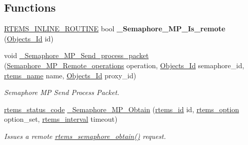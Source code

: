 \subsection*{Functions}
\begin{DoxyCompactItemize}
\item 
\mbox{\label{group__ClassicSEM_gadf24d8b39c8fef2dec6e2477b16f36a2}} 
\mbox{\hyperlink{group__RTEMSScoreBaseDefs_gac216239df231d5dbd15e3520b0b9313f}{R\+T\+E\+M\+S\+\_\+\+I\+N\+L\+I\+N\+E\+\_\+\+R\+O\+U\+T\+I\+NE}} bool {\bfseries \+\_\+\+Semaphore\+\_\+\+M\+P\+\_\+\+Is\+\_\+remote} (\mbox{\hyperlink{group__RTEMSScoreObject_ga5821f52a51072941bdd603e542d0863e}{Objects\+\_\+\+Id}} id)
\item 
void \mbox{\hyperlink{group__ClassicSEM_gabf7ddd01f6d1775f91d196955b8c7699}{\+\_\+\+Semaphore\+\_\+\+M\+P\+\_\+\+Send\+\_\+process\+\_\+packet}} (\mbox{\hyperlink{group__ClassicSEM_ga24fc0fecc46118303c1de1742a2c5adf}{Semaphore\+\_\+\+M\+P\+\_\+\+Remote\+\_\+operations}} operation, \mbox{\hyperlink{group__RTEMSScoreObject_ga5821f52a51072941bdd603e542d0863e}{Objects\+\_\+\+Id}} semaphore\+\_\+id, \mbox{\hyperlink{group__ClassicTasks_ga55fb63c49f68c0cbd9bee004da15b1fd}{rtems\+\_\+name}} name, \mbox{\hyperlink{group__RTEMSScoreObject_ga5821f52a51072941bdd603e542d0863e}{Objects\+\_\+\+Id}} proxy\+\_\+id)
\begin{DoxyCompactList}\small\item\em Semaphore MP Send Process Packet. \end{DoxyCompactList}\item 
\mbox{\label{group__ClassicSEM_ga22c4bec291ea89e9825a4c08519f9d54}} 
\mbox{\hyperlink{group__ClassicStatus_ga545d41846817eaba6143d52ee4d9e9fe}{rtems\+\_\+status\+\_\+code}} \mbox{\hyperlink{group__ClassicSEM_ga22c4bec291ea89e9825a4c08519f9d54}{\+\_\+\+Semaphore\+\_\+\+M\+P\+\_\+\+Obtain}} (\mbox{\hyperlink{group__ClassicTasks_gab20892b814dced7dd4e5b9bf42becd57}{rtems\+\_\+id}} id, \mbox{\hyperlink{group__ClassicOptions_gad26685eb0e60a9650082935c31920e29}{rtems\+\_\+option}} option\+\_\+set, \mbox{\hyperlink{group__ClassicTasks_gad39c43f949683d46874e3a5586b93aee}{rtems\+\_\+interval}} timeout)
\begin{DoxyCompactList}\small\item\em Issues a remote \mbox{\hyperlink{group__ClassicSem_gae8c1795a85f982ceea89e7faf7d68e91}{rtems\+\_\+semaphore\+\_\+obtain()}} request. \end{DoxyCompactList}\item 

\end{DoxyCompactItemize}
